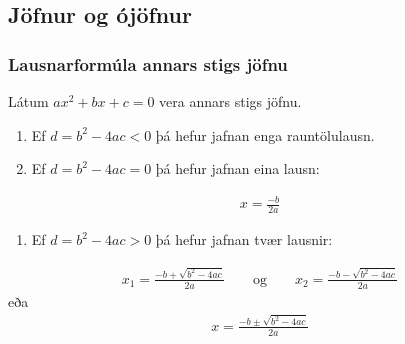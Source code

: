 \documentclass[a4paper,10pt,icelandic]{sphinxmanual}
\begin{document}
\subsection{Jöfnur og ójöfnur}
\label{\detokenize{Kafli12:jofnur-og-ojofnur}}

\subsubsection{Lausnarformúla annars stigs jöfnu}
\label{\detokenize{Kafli12:lausnarformula-annars-stigs-jofnu}}
Látum \(ax^2+bx+c=0\) vera annars stigs jöfnu.
\begin{enumerate}
%
\item {} 
Ef \(d = b^2-4ac<0\) þá hefur jafnan enga rauntölulausn.

\item {} 
Ef \(d  = b^2-4ac=0\) þá hefur jafnan eina lausn:

\end{enumerate}
\begin{equation*}
\begin{split}x=\frac{-b}{2a}\end{split}
\end{equation*}\begin{enumerate}
%
\setcounter{enumi}{2}
\item {} 
Ef \(d = b^2-4ac>0\) þá hefur jafnan tvær lausnir:

\end{enumerate}
\begin{equation*}
\begin{split}x_1=\frac{-b+\sqrt{b^2-4ac}}{2a} \qquad \text{og} \qquad x_2=\frac{-b-\sqrt{b^2-4ac}}{2a}\end{split}
\end{equation*}
eða
\begin{equation*}
\begin{split}x=\frac{-b\pm\sqrt{b^2-4ac}}{2a}\end{split}
\end{equation*}
\end{document}
